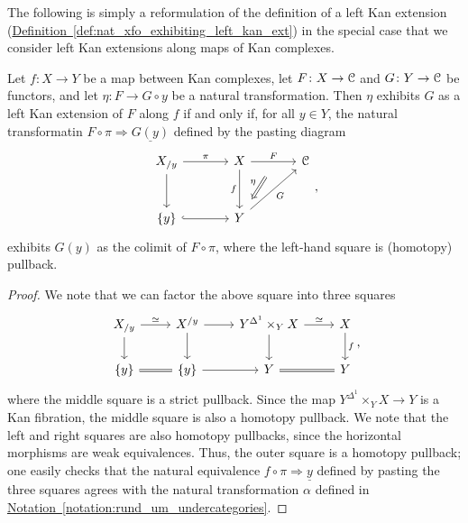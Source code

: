 \documentclass[main.tex]{subfiles}
\begin{document}
The following is simply a reformulation of the definition of a left Kan extension (\hyperref[def:nat_xfo_exhibiting_left_kan_ext]{Definition~\ref*{def:nat_xfo_exhibiting_left_kan_ext}}) in the special case that we consider left Kan extensions along maps of Kan complexes.
\begin{lemma}
  Let $f\colon X \to Y$ be a map between Kan complexes, let $F\colon X \to \mathcal{C}$ and $G\colon Y \to \mathcal{C}$ be functors, and let $\eta\colon F \to G \circ y$ be a natural transformation. Then $\eta$ exhibits $G$ as a left Kan extension of $F$ along $f$ if and only if, for all $y \in Y$, the natural transformatin $F \circ \pi \Rightarrow \underline{G(y)}$ defined by the pasting diagram
  \begin{equation*}
    \begin{tikzcd}[row sep=large, column sep=large]
      X_{/y}
      \arrow[r, "\pi", ""{name=LA, swap}]
      \arrow[d, ""{name=LD}]
      & X
      \arrow[d, swap, "f"]
      \arrow[r, "F", ""{below, name=M}]
      & \category{C}
      \\
      \{y\}
      \arrow[r, hook, ""{name=LB}]
      & Y
      \arrow[ur, swap, "G"]
      \arrow[from=M, Rightarrow, shorten=2ex, swap, "\eta"]
    \end{tikzcd},
  \end{equation*}
  exhibits $G(y)$ as the colimit of $F \circ \pi$, where the left-hand square is (homotopy) pullback.
\end{lemma}
\begin{proof}
  We note that we can factor the above square into three squares
  \begin{equation*}
    \begin{tikzcd}
      X_{/y}
      \arrow[r, "\simeq"]
      \arrow[d]
      & X^{/y}
      \arrow[r]
      \arrow[d]
      & Y^{\Delta^{1}} \times_{Y} X
      \arrow[r, "\simeq"]
      \arrow[d]
      & X
      \arrow[d, "f"]
      \\
      \{y\}
      \arrow[r, equals]
      & \{y\}
      \arrow[r]
      & Y
      \arrow[r, equals]
      & Y
    \end{tikzcd},
  \end{equation*}
  where the middle square is a strict pullback. Since the map $Y^{\Delta^{1}} \times_{Y}X \to Y$ is a Kan fibration, the middle square is also a homotopy pullback. We note that the left and right squares are also homotopy pullbacks, since the horizontal morphisms are weak equivalences. Thus, the outer square is a homotopy pullback; one easily checks that the natural equivalence $f \circ \pi \Rightarrow \underline{y}$ defined by pasting the three squares agrees with the natural transformation $\alpha$ defined in \hyperref[notation:rund_um_undercategories]{Notation~\ref*{notation:rund_um_undercategories}}.
\end{proof}
\end{document}

